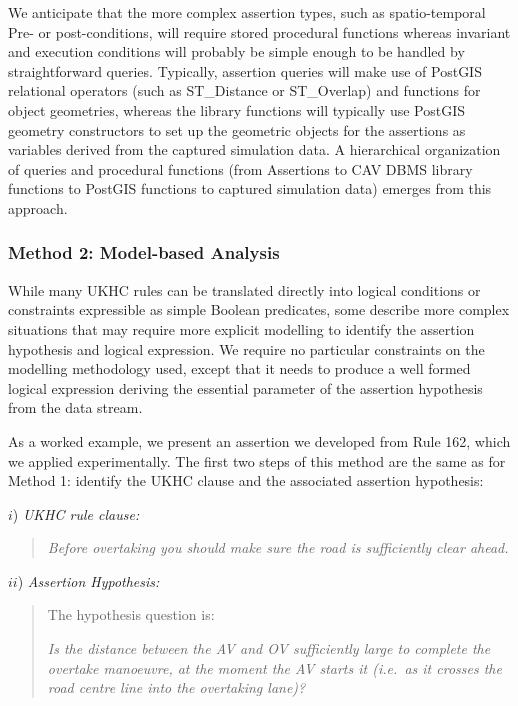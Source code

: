 We anticipate that the more complex assertion types, such as spatio-temporal Pre- or post-conditions, will require stored procedural functions whereas invariant and execution conditions will probably be simple enough to be handled by straightforward queries.  
Typically, assertion queries will make use of PostGIS relational operators (such as ST\_Distance or ST\_Overlap) and functions for object geometries, whereas the library functions will typically use PostGIS geometry constructors to set up the geometric objects for the assertions as variables derived from the captured simulation data. %
A hierarchical organization of queries and procedural functions (from Assertions to CAV DBMS library functions to PostGIS functions to captured simulation data) emerges from this approach.

\vspace{2mm}
\subsubsection{\textbf{Method 2}: Model-based Analysis} 
\label{model_based_analysis}

While many UKHC rules can be translated directly into logical conditions or constraints expressible as simple Boolean predicates, some describe more complex situations that may require more explicit modelling to identify the assertion hypothesis and logical expression. We require no particular constraints on the modelling methodology used, except that it needs to produce a well formed logical expression deriving the essential parameter of the assertion hypothesis from the data stream.

As a worked example, we present an assertion we developed from Rule 162, which we applied experimentally. %
The first two steps of this method are the same as for Method 1: identify the UKHC clause and the associated assertion hypothesis:

\noindent $i$) \emph{UKHC rule clause:}
		\begin{quote}
			\textit{Before overtaking you should make sure the road is sufficiently clear ahead.}
		\end{quote}
\noindent $ii$) \emph{Assertion Hypothesis:}
	\begin{quote}
		The hypothesis question is:
		
		 \textit{Is the distance between the AV and OV sufficiently large to complete the overtake manoeuvre, at the moment the AV starts it (i.e.\ as it crosses the road centre line into the overtaking lane)?}
	\end{quote}


